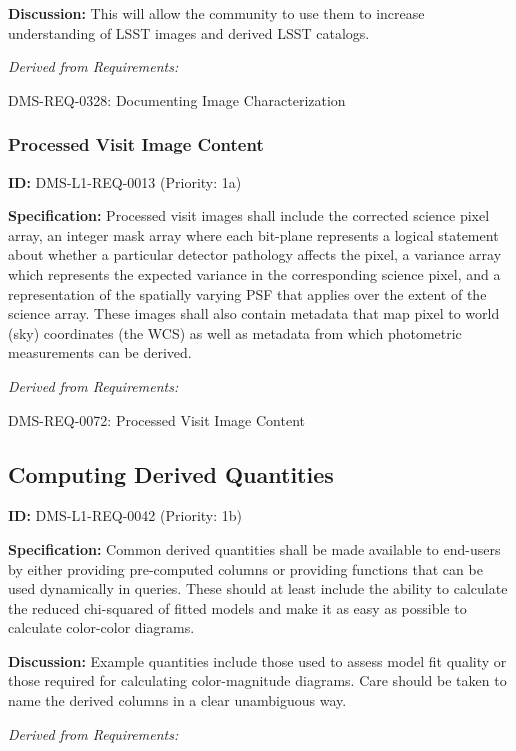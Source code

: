 \documentclass[SE,toc,lsstdraft]{lsstdoc}
\begin{document}
\textbf{Discussion:} This will allow the community to use them to increase understanding of LSST images and derived LSST catalogs.

\emph{Derived from Requirements:}

DMS-REQ-0328:
Documenting Image Characterization \newline

\subsubsection{Processed Visit Image Content}

\label{DMS-L1-REQ-0013}
\textbf{ID:} DMS-L1-REQ-0013 (Priority: 1a)

\textbf{Specification:} Processed visit images shall include the corrected science pixel array, an integer mask array where each bit-plane represents a logical statement about whether a particular detector pathology affects the pixel, a variance array which represents the expected variance in the corresponding science pixel, and a representation of the spatially varying PSF that applies over the extent of the science array. These images shall also contain metadata that map pixel to world (sky) coordinates (the WCS) as well as metadata from which photometric measurements can be derived.

\emph{Derived from Requirements:}

DMS-REQ-0072:
Processed Visit Image Content \newline

\subsection{Computing Derived Quantities}

\label{DMS-L1-REQ-0042}
\textbf{ID:} DMS-L1-REQ-0042 (Priority: 1b)

\textbf{Specification:} Common derived quantities shall be made available to end-users by either providing pre-computed columns or providing functions that can be used dynamically in queries. These should at least include the ability to calculate the reduced chi-squared of fitted models and make it as easy as possible to calculate color-color diagrams.

\textbf{Discussion:} Example quantities include those used to assess model fit quality or those required for calculating color-magnitude diagrams. Care should be taken to name the derived columns in a clear unambiguous way.

\emph{Derived from Requirements:}
\end{document}
